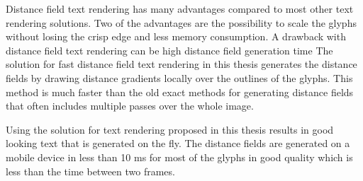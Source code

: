 Distance field text rendering has many advantages compared to most other text rendering solutions. Two of the advantages are the possibility to scale the glyphs without losing the crisp edge and less memory consumption. A drawback with distance field text rendering can be high distance field generation time The solution for fast distance field text rendering in this thesis generates the distance fields by drawing distance gradients locally over the outlines of the glyphs. This method is much faster than the old exact methods for generating distance fields that often includes multiple passes over the whole image.

Using the solution for text rendering proposed in this thesis results in good looking text that is generated on the fly. The distance fields are generated on a mobile device in less than 10 ms for most of the glyphs in good quality which is less than the time between two frames.